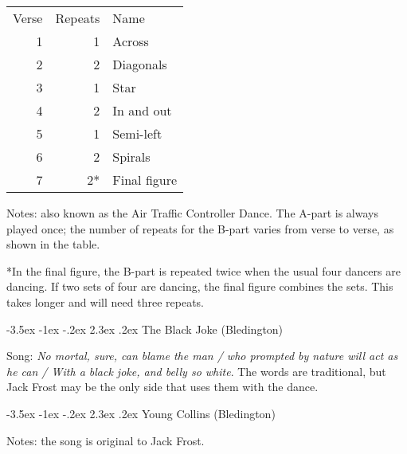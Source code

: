 \documentclass[12pt,a4paper]{article}
\makeatletter
\renewcommand\section{\@startsection {section}{1}{\z@}%
                                   {-3.5ex \@plus -1ex \@minus -.2ex}%
                                   {2.3ex \@plus.2ex}%
                                   {\normalfont\Large}}
\makeatother
\begin{document}

\begin{minipage}[t]{6cm}
\vspace{0pt}
\begin{tabular}{rrl}
Verse & Repeats & Name \\
1 & 1 & Across \\
2 & 2 & Diagonals \\
3 & 1 & Star \\
4 & 2 & In and out \\
5 & 1 & Semi-left \\
6 & 2 & Spirals \\
7 & 2* & Final figure
\end{tabular}
\end{minipage} \hspace{3mm} \begin{minipage}[t]{10cm}
\vspace{0pt}
\noindent Notes: also known as the Air Traffic Controller Dance.
The A-part is always played once; the number of repeats for the
B-part varies from verse to verse, as shown in the table.

\smallskip

*In the final figure, the B-part is repeated twice when the usual four
dancers are dancing.  If two sets of four are dancing, the final
figure combines the sets. This takes longer and will need three
repeats.
\end{minipage}
\pagebreak[1]

\section{The Black Joke (Bledington)}


Song: \textit{No mortal, sure, can blame the man / who prompted by nature
  will act as he can / With a black joke, and belly so white}. The words are
traditional, but Jack Frost may be the only side that uses them with the
dance.

\pagebreak[1]

\section{Young Collins (Bledington)}


\noindent Notes: the song is original to Jack Frost.
\end{document}
